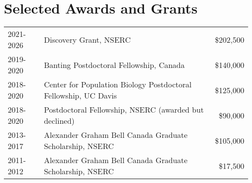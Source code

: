 \documentclass[12pt]{article}
\begin{document}
\section*{Selected Awards and Grants}

\begin{tabular}{llr}
  2021-2026 & Discovery Grant, NSERC & \$202,500 \\
  2019-2020 & Banting Postdoctoral Fellowship, Canada & \$140,000 \\
  2018-2020 & Center for Population Biology Postdoctoral Fellowship, UC Davis & \$125,000 \\
  2018-2020 & Postdoctoral Fellowship, NSERC (awarded but declined) & \$90,000 \\
  2013-2017 & Alexander Graham Bell Canada Graduate Scholarship, NSERC & \$105,000\\
  2011-2012 & Alexander Graham Bell Canada Graduate Scholarship, NSERC & \$17,500\\

\end{tabular}
\end{document}
